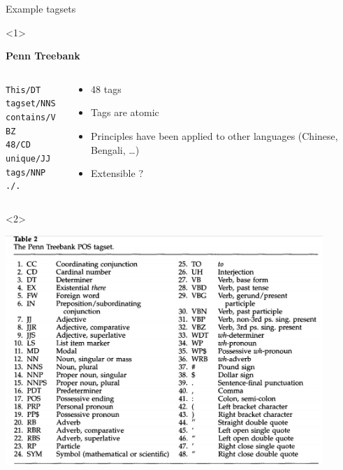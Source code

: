 \documentclass{beamer}
\begin{document}
\begin{frame}{Example tagsets}

  
\begin{onlyenv}<1>
\begin{center}
\textbf{Penn Treebank} 
\end{center}
  \begin{columns}
  
    \begin{column}{0.4\textwidth}
    
    \begin{alltt}
       This/DT \\
       tagset/NNS  \\
       contains/VBZ \\
       48/CD \\
       unique/JJ \\
       tags/NNP  \\
       ./.  \\
    \end{alltt}
    
    \end{column}
    
    \begin{column}{0.6\textwidth}
    
    \begin{itemize}
       \item 48 tags 
       \item Tags are atomic
       \item Principles have been applied to other languages (Chinese, Bengali, \ldots)
       \item Extensible ? 
    \end{itemize}
    \end{column}

  \end{columns}
  
\end{onlyenv}

\begin{onlyenv}<2>
  \begin{center}
  \includegraphics[width=0.9\textwidth]{images/penn-tagset.png}
  \end{center}
\end{onlyenv}


\end{frame}
\end{document}
